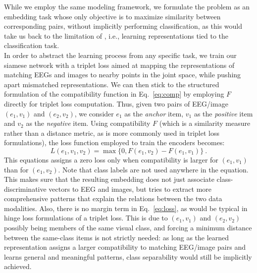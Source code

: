 \documentclass[10pt,journal,compsoc,twocolumn]{IEEEtran}
\begin{document}
While we employ the same modeling framework, we formulate the problem as an embedding task whose only objective is to maximize similarity between corresponding pairs, without implicitly performing classification, as this would take us back to the limitation of \cite{Spampinato2016deep}, i.e., learning representations tied to the classification task.\\
In order to abstract the learning process from any specific task, we train our siamese network with a triplet loss aimed at mapping the representations of matching EEGs and images to nearby points in the joint space, while pushing apart mismatched representations. We can then stick to the structured formulation of the compatibility function in Eq.~\ref{eq:comp} by employing $F$ directly for triplet loss computation. Thus, given two pairs of EEG/image $(e_1, v_1)$ and $(e_2, v_2)$, we consider $e_1$ as the \emph{anchor} item, $v_1$ as the \emph{positive} item and $v_2$ as the \emph{negative} item. Using compatibility $F$ (which is a similarity measure rather than a distance metric, as is more commonly used in triplet loss formulations), the loss function employed to train the encoders becomes:
\begin{equation}
 L(e_1, v_1, v_2) = \max \{ 0, F(e_1, v_2) - F(e_1, v_1) \}~.
 \label{eq:loss}
\end{equation}
This equations assigns a zero loss only when compatibility is larger for $(e_1,v_1)$ than for $(e_1,v_2)$. Note that class labels are not used anywhere in the equation. This makes sure that the resulting embedding does not just associate class-discriminative vectors to EEG and images, but tries to extract more comprehensive patterns that explain the relations between the two data modalities. Also, there is no margin term in Eq.~\ref{eq:loss}, as would be typical in hinge loss formulations of a triplet loss. This is due to $(e_1,v_1)$ and $(e_2,v_2)$ possibly being members of the same visual class, and forcing a minimum distance between the same-class items is not strictly needed: as long as the learned representation assigns a larger compatibility to matching EEG/image pairs and learns general and meaningful patterns, class separability would still be implicitly achieved.

\end{document}
